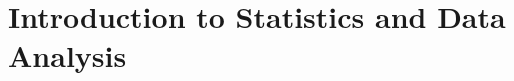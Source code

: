 \documentclass[11pt,a4paper,openany]{book}
\begin{document}
\chapter{Introduction to Statistics and Data Analysis}

%

% 
\end{document}

